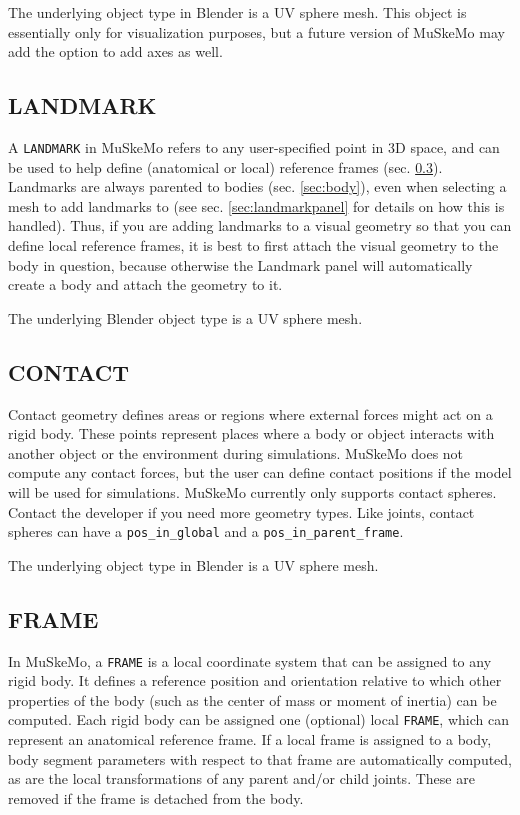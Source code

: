 \documentclass{article}
\begin{document}
The underlying object type in Blender is a UV sphere mesh. This object is essentially only for visualization purposes, but a future version of MuSkeMo may add the option to add axes as well.

\subsection{LANDMARK}
\label{sec:landmark}

A \texttt{LANDMARK} in MuSkeMo refers to any user-specified point in 3D space, and can be used to help define (anatomical or local) reference frames (sec. \ref{sec:frame}). Landmarks are always parented to bodies (sec. \ref{sec:body}), even when selecting a mesh to add landmarks to (see sec. \ref{sec:landmarkpanel} for details on how this is handled). Thus, if you are adding landmarks to a visual geometry so that you can define local reference frames, it is best to first attach the visual geometry to the body in question, because otherwise the Landmark panel will automatically create a body and attach the geometry to it.

The underlying Blender object type is a UV sphere mesh.

\subsection{CONTACT}

Contact geometry defines areas or regions where external forces might act on a rigid body. These points represent places where a body or object interacts with another object or the environment during simulations. MuSkeMo does not compute any contact forces, but the user can define contact positions if the model will be used for simulations. MuSkeMo currently only supports contact spheres. Contact the developer if you need more geometry types. 
Like joints, contact spheres can have a \texttt{pos\_in\_global} and a \texttt{pos\_in\_parent\_frame}.


The underlying object type in Blender is a UV sphere mesh.


\subsection{FRAME}
\label{sec:frame}
In MuSkeMo, a \texttt{FRAME} is a local coordinate system that can be assigned to any rigid body. It defines a reference position and orientation relative to which other properties of the body (such as the center of mass or moment of inertia) can be computed. Each rigid body can be assigned one (optional) local \texttt{FRAME}, which can represent an anatomical reference frame. If a local frame is assigned to a body, body segment parameters with respect to that frame are automatically computed, as are the local transformations of any parent and/or child joints. These are removed if the frame is detached from the body.
\end{document}
